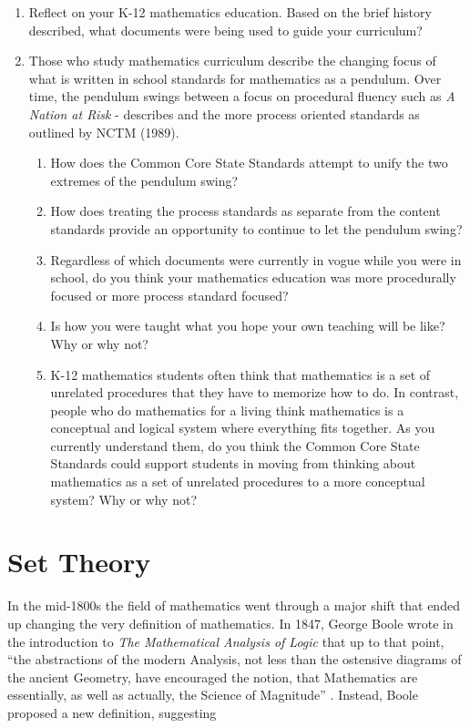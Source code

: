 \documentclass[
]{book}
\providecommand{\tightlist}{%
  \setlength{\itemsep}{0pt}\setlength{\parskip}{0pt}}
\theoremstyle{definition}
\theoremstyle{definition}
\theoremstyle{definition}
\theoremstyle{definition}
\theoremstyle{remark}
\begin{document}
\begin{enumerate}
\def\labelenumi{\arabic{enumi}.}
\item
  Reflect on your K-12 mathematics education. Based on the brief history described, what documents were being used to guide your curriculum?
\item
  Those who study mathematics curriculum describe the changing focus of what is written in school standards for mathematics as a pendulum. Over time, the pendulum swings between a focus on procedural fluency such as \emph{A Nation at Risk} -\citet{NCEE1983} describes and the more process oriented standards as outlined by NCTM (1989).

  \begin{enumerate}
  \def\labelenumii{\alph{enumii})}
  \tightlist
  \item
    How does the Common Core State Standards attempt to unify the two extremes of the pendulum swing?
  \item
    How does treating the process standards as separate from the content standards provide an opportunity to continue to let the pendulum swing?
  \item
    Regardless of which documents were currently in vogue while you were in school, do you think your mathematics education was more procedurally focused or more process standard focused?
  \item
    Is how you were taught what you hope your own teaching will be like? Why or why not?
  \item
    K-12 mathematics students often think that mathematics is a set of unrelated procedures that they have to memorize how to do. In contrast, people who do mathematics for a living think mathematics is a conceptual and logical system where everything fits together. As you currently understand them, do you think the Common Core State Standards could support students in moving from thinking about mathematics as a set of unrelated procedures to a more conceptual system? Why or why not?
  \end{enumerate}
\end{enumerate}

\hypertarget{sets}{%
\chapter{Set Theory}\label{sets}}

In the mid-1800s the field of mathematics went through a major shift that ended up changing the very definition of mathematics. In 1847, George Boole wrote in the introduction to \emph{The Mathematical Analysis of Logic} that up to that point, ``the abstractions of the modern Analysis, not less than the ostensive diagrams of the ancient Geometry, have encouraged the notion, that Mathematics are essentially, as well as actually, the Science of Magnitude'' \citep{Boole}. Instead, Boole proposed a new definition, suggesting
\end{document}
